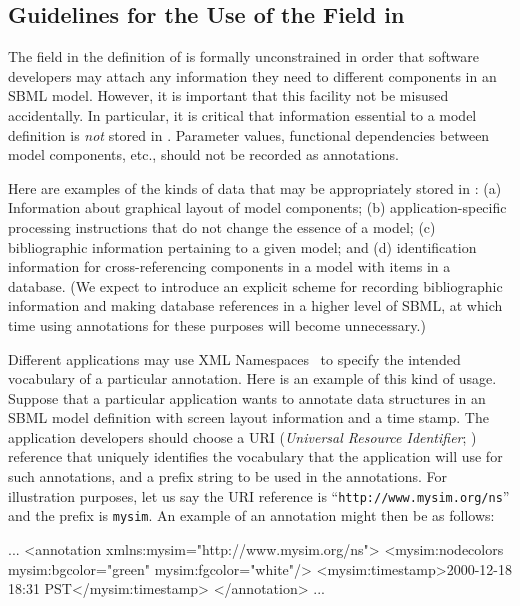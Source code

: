 \documentclass[10pt]{cekarticle}
\newcommand{\changed}[1]{\textcolor{BrickRed}{#1}}
\newenvironment{blockChanged}{\color{BrickRed}}{}
\begin{document}
\subsection{Guidelines for the Use of the \changed{} Field in
  } 
\label{sec:annotation-guidelines}

The \changed{} field in the definition of 
is formally unconstrained in order that software developers may attach any
information they need to different components in an SBML model.  However,
it is important that this facility not be misused accidentally.  In
particular, it is critical that information essential to a model definition
is \emph{not} stored in \changed{}.  Parameter values,
functional dependencies between model components, etc., should not be
recorded as annotations.

Here are examples of the kinds of data that may be appropriately stored in
\changed{}: (a) Information about graphical layout of
model components; (b) application-specific processing instructions that do
not change the essence of a model; (c) bibliographic information pertaining
to a given model; and (d) identification information for cross-referencing
components in a model with items in a database.  (We expect to introduce an
explicit scheme for recording bibliographic information and making database
references in \changed{a higher level of SBML}, at which time using
annotations for these purposes will become unnecessary.)

Different applications may use XML Namespaces~\citep{bray:1999} to specify
the intended vocabulary of a particular annotation.  Here is an example of
this kind of usage.  Suppose that a particular application wants to
annotate data structures in an SBML model definition with screen layout
information and a time stamp.  The application developers should choose a
URI (\emph{Universal Resource Identifier}; \citealt{harold:2001,w3c:2000})
reference that uniquely identifies the vocabulary that the
application will use for such annotations, and a prefix string to be used
in the annotations.  For illustration purposes, let us say the URI
reference is ``\texttt{http://www.mysim.org/ns}'' and the prefix is
\texttt{mysim}.  An example of an annotation might then be as follows:

\begin{blockChanged}
\begin{example}
...
<annotation xmlns:mysim="http://www.mysim.org/ns">
    <mysim:nodecolors mysim:bgcolor="green" mysim:fgcolor="white"/>
    <mysim:timestamp>2000-12-18 18:31 PST</mysim:timestamp>
</annotation>
...
\end{example}
\end{blockChanged}
\end{document}
